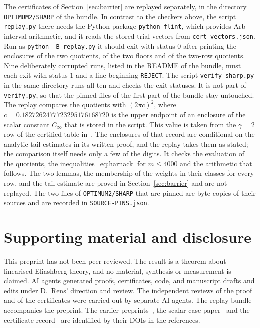 \documentclass[10pt]{article}
\theoremstyle{remark}
\newcommand{\us}{\_\allowbreak}
\newcommand{\Cinf}{C_\infty}
\begin{document}
The certificates of Section~\ref{sec:barrier} are replayed separately, in the directory \texttt{OPTIMUM2/SHARP} of the bundle. In contrast to the checkers above, the script \texttt{replay.py} there needs the Python package \texttt{python-flint}, which provides Arb interval arithmetic, and it reads the stored trial vectors from \texttt{cert\us vectors.json}. Run as \texttt{python -B replay.py} it should exit with status $0$ after printing the enclosures of the two quotients, of the two floors and of the two-row quotients. Nine deliberately corrupted runs, listed in the README of the bundle, must each exit with status $1$ and a line beginning \texttt{REJECT}. The script \texttt{verify\us sharp.py} in the same directory runs all ten and checks the exit statuses. It is not part of \texttt{verify.py}, so that the pinned files of the first part of the bundle stay untouched. The replay compares the quotients with $(2\pi c)^2$, where $c=0.1827262477723295176168720$ is the upper endpoint of an enclosure of the scalar constant $\Cinf$ that is stored in the script. This value is taken from the $\gamma=2$ row of the certified table in~\cite{gamma}. The enclosures of that record are conditional on the analytic tail estimates in its written proof, and the replay takes them as stated; the comparison itself needs only a few of the digits. It checks the evaluation of the quotients, the inequalities~\eqref{eq:harnack} for $m\le4000$ and the arithmetic that follows. The two lemmas, the membership of the weights in their classes for every row, and the tail estimate are proved in Section~\ref{sec:barrier} and are not replayed. The two files of \texttt{OPTIMUM2/SHARP} that are pinned are byte copies of their sources and are recorded in \texttt{SOURCE-PINS.json}.

\section*{Supporting material and disclosure}

This preprint has not been peer reviewed. The result is a theorem about linearised Eliashberg theory, and no material, synthesis or measurement is claimed. AI agents generated proofs, certificates, code, and manuscript drafts and edits under D.~Rens' direction and review. The independent reviews of the proof and of the certificates were carried out by separate AI agents. The replay bundle accompanies the preprint. The earlier preprints~\cite{predecessor,optimum}, the scalar-case paper~\cite{finite} and the certificate record~\cite{gamma} are identified by their DOIs in the references.

\begingroup
\raggedright


\endgroup
\end{document}
